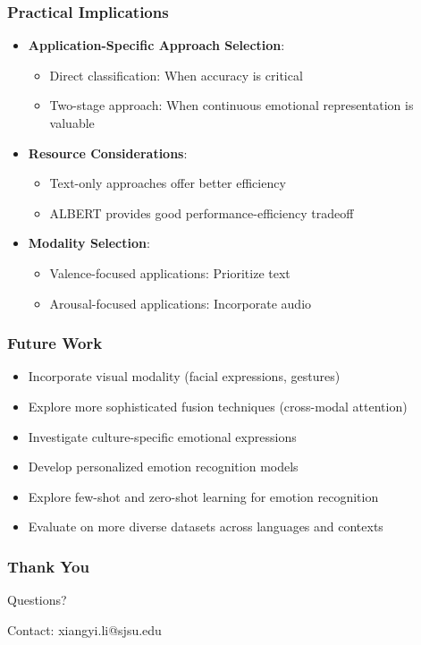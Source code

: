 \documentclass{beamer}
\begin{document}
\begin{frame}
\frametitle{Practical Implications}
\begin{itemize}
    \item \textbf{Application-Specific Approach Selection}:
    \begin{itemize}
        \item Direct classification: When accuracy is critical
        \item Two-stage approach: When continuous emotional representation is valuable
    \end{itemize}
    \item \textbf{Resource Considerations}:
    \begin{itemize}
        \item Text-only approaches offer better efficiency
        \item ALBERT provides good performance-efficiency tradeoff
    \end{itemize}
    \item \textbf{Modality Selection}:
    \begin{itemize}
        \item Valence-focused applications: Prioritize text
        \item Arousal-focused applications: Incorporate audio
    \end{itemize}
\end{itemize}
\end{frame}

\begin{frame}
\frametitle{Future Work}
\begin{itemize}
    \item Incorporate visual modality (facial expressions, gestures)
    \item Explore more sophisticated fusion techniques (cross-modal attention)
    \item Investigate culture-specific emotional expressions
    \item Develop personalized emotion recognition models
    \item Explore few-shot and zero-shot learning for emotion recognition
    \item Evaluate on more diverse datasets across languages and contexts
\end{itemize}
\end{frame}

\begin{frame}
\frametitle{Thank You}
\begin{center}
\LARGE{Questions?}

\vspace{1cm}
\normalsize
Contact: xiangyi.li@sjsu.edu
\end{center}
\end{frame}
\end{document}
